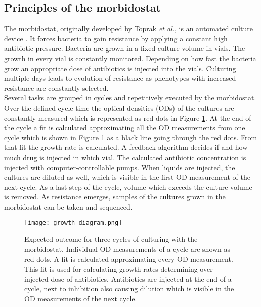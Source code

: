 \subsection{Principles of the morbidostat} 
The morbidostat, originally developed by Toprak \textit{et al.}, is an automated culture device \cite{toprak_building_2013}. It forces bacteria to gain resistance by applying a constant high antibiotic pressure. Bacteria are grown in a fixed culture volume in vials. The growth in every vial is constantly monitored. Depending on how fast the bacteria grow an appropriate dose of antibiotics is injected into the vials. Culturing multiple days leads to evolution of resistance as phenotypes with increased resistance are constantly selected. \\
Several tasks are grouped in cycles and repetitively executed by the morbidostat. Over the defined cycle time the optical densities (ODs) of the cultures are constantly measured which is represented as red dots in Figure \ref{figure:principle}. At the end of the cycle a fit is calculated approximating all the OD measurements from one cycle which is shown in Figure \ref{figure:principle} as a black line going through the red dots. From that fit the growth rate is calculated. A feedback algorithm decides if and how much drug is injected in which vial. The calculated antibiotic concentration is injected with computer-controllable pumps. When liquids are injected, the cultures are diluted as well, which is visible in the first OD measurement of the next cycle. As a last step of the cycle, volume which exceeds the culture volume is removed. As resistance emerges, samples of the cultures grown in the morbidostat can be taken and sequenced.    
\begin{figure}
	\texttt{[image: growth\_diagram.png]}
	\caption{Expected outcome for three cycles of culturing with the morbidostat. Individual OD measurements of a cycle are shown as red dots. A fit is calculated approximating every OD measurement. This fit is used for calculating growth rates determining over injected dose of antibiotics. Antibiotics are injected at the end of a cycle, next to inhibition also causing dilution which is visible in the OD measurements of the next cycle.}
	\label{figure:principle}
\end{figure} 

